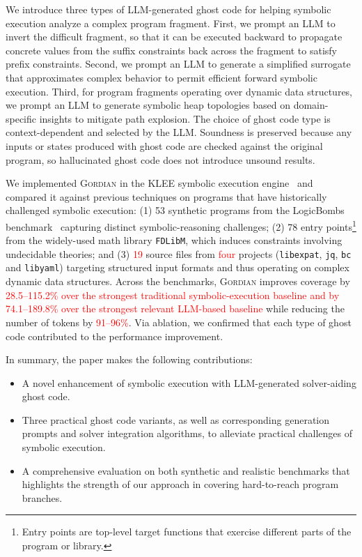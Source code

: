 \documentclass[acmsmall,screen,nonacm]{acmart}
\newcommand{\rev}[1]{\textcolor{red}{#1}}
\newcommand{\rev}[1]{#1}
\newcommand{\projName}{\textsc{Gordian}\xspace}
\theoremstyle{definition}
\begin{document}
We introduce three types of LLM-generated ghost code for helping symbolic execution analyze a complex program fragment. First, we prompt an LLM to invert the difficult fragment, so that it can be executed backward to propagate concrete values from the suffix constraints back across the fragment to satisfy prefix constraints. Second, we prompt an LLM to generate a simplified surrogate that approximates complex behavior to permit efficient forward symbolic execution. Third, for program fragments operating over dynamic data structures, we prompt an LLM to generate symbolic heap topologies based on domain-specific insights to mitigate path explosion. The choice of ghost code type is context-dependent and selected by the LLM. Soundness is preserved because any inputs or states produced with ghost code are checked against the original program, so hallucinated ghost code does not introduce unsound results.

We implemented \projName in the KLEE symbolic execution engine~\cite{klee} and compared it against previous techniques on programs that have historically challenged symbolic execution: (1) 53 synthetic programs from the LogicBombs benchmark~\cite{xu2018benchmarking} capturing distinct symbolic-reasoning challenges; (2) 78 entry points\footnote{Entry points are top-level target functions that exercise different parts of the program or library.} from the widely-used math library \texttt{FDLibM}, which induces constraints involving undecidable theories; and (3) \rev{19} source files from \rev{four} projects (\texttt{libexpat}, \texttt{jq}, \texttt{bc} and \texttt{libyaml}) targeting structured input formats and thus operating on complex dynamic data structures. Across the benchmarks, \projName{} improves coverage by \rev{28.5--115.2\% over the strongest traditional symbolic-execution baseline
and by 74.1--189.8\% over the strongest relevant LLM-based baseline} while reducing the number of tokens by \rev{91--96\%}. Via ablation, we confirmed that each type of ghost code contributed to the performance improvement.

In summary, the paper makes the following contributions:

\begin{itemize}
\item A novel enhancement of symbolic execution with LLM-generated solver-aiding ghost code.
\item Three practical ghost code variants, as well as corresponding generation prompts and solver integration algorithms, to alleviate practical challenges of symbolic execution.
\item A comprehensive evaluation on both synthetic and realistic benchmarks that highlights the strength of our approach in covering hard-to-reach program branches.
\end{itemize}
\end{document}
